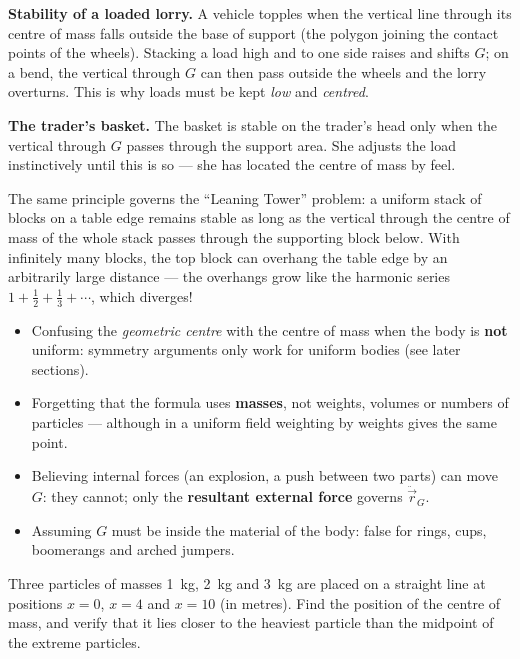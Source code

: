 \documentclass[11pt]{article}
\begin{document}
\textbf{Stability of a loaded lorry.} A vehicle topples when the vertical line through its centre of mass falls outside the base of support (the polygon joining the contact points of the wheels). Stacking a load high and to one side raises and shifts $G$; on a bend, the vertical through $G$ can then pass outside the wheels and the lorry overturns. This is why loads must be kept \emph{low} and \emph{centred}.

\textbf{The trader's basket.} The basket is stable on the trader's head only when the vertical through $G$ passes through the support area. She adjusts the load instinctively until this is so — she has located the centre of mass by feel.

\begin{savaistu}
The same principle governs the ``Leaning Tower'' problem: a uniform stack of blocks on a table edge remains stable as long as the vertical through the centre of mass of the whole stack passes through the supporting block below. With infinitely many blocks, the top block can overhang the table edge by an arbitrarily large distance — the overhangs grow like the harmonic series $1+\tfrac12+\tfrac13+\cdots$, which diverges!
\end{savaistu}

\begin{attention}
\begin{itemize}
\item Confusing the \emph{geometric centre} with the centre of mass when the body is \textbf{not} uniform: symmetry arguments only work for uniform bodies (see later sections).
\item Forgetting that the formula uses \textbf{masses}, not weights, volumes or numbers of particles — although in a uniform field weighting by weights gives the same point.
\item Believing internal forces (an explosion, a push between two parts) can move $G$: they cannot; only the \textbf{resultant external force} governs $\ddot{\vec{r}}_G$.
\item Assuming $G$ must be inside the material of the body: false for rings, cups, boomerangs and arched jumpers.
\end{itemize}
\end{attention}

\begin{exercice}
Three particles of masses \SI{1}{kg}, \SI{2}{kg} and \SI{3}{kg} are placed on a straight line at positions $x=0$, $x=4$ and $x=10$ (in metres). Find the position of the centre of mass, and verify that it lies closer to the heaviest particle than the midpoint of the extreme particles.
\end{exercice}
\end{document}
